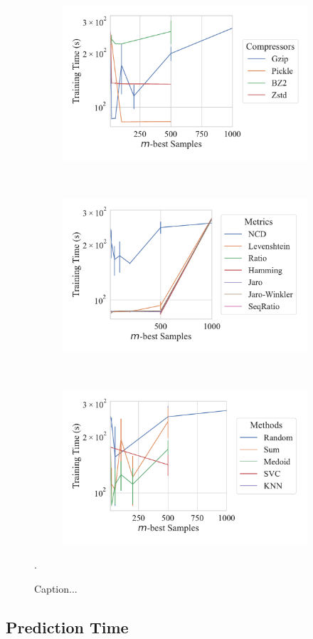 \documentclass[sigconf]{acmart}
\begin{document}
\begin{figure}
	\begin{subfigure}
		\centering
		\includegraphics[width=.32\textwidth]{figs/truthseeker/compressor_vs_train_time.pdf}
	\end{subfigure}%
	~
	\begin{subfigure}
		\centering
		\includegraphics[width=.32\textwidth]{figs/truthseeker/metric_vs_train_time.pdf}
	\end{subfigure}
	~
	\begin{subfigure}
		\centering
		\includegraphics[width=.32\textwidth]{figs/truthseeker/method_vs_train_time.pdf}
	\end{subfigure}
	\caption{ Caption...}.
	\label{fig:accuracy}
\end{figure}

\subsection{Prediction Time}
\end{document}
